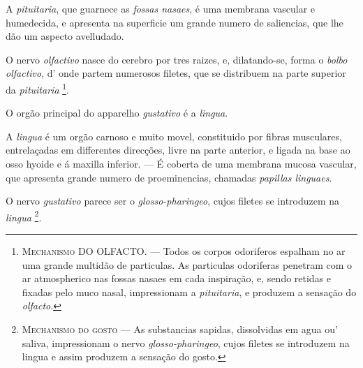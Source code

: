A \emph{pituitaria}, que guarnece as \emph{fossas nasaes}, é uma membrana vascular e humedecida, e apresenta na superficie um grande numero de saliencias, que lhe dão um aspecto avelludado.

O nervo \emph{olfactivo} nasce do cerebro por tres raizes, e, dilatando-se, forma o \emph{bolbo olfactivo}, d' onde partem numerosos filetes, que se distribuem na parte superior da \emph{pituitaria} \footnote{\textsc{Mechanismo} DO OLFACTO. --- Todos os corpos odoriferos espalham no ar uma grande multidão de particulas. As particulas odoriferas penetram com o ar atmospherico nas fossas nasaes em cada inspiração, e, sendo retidas e fixadas pelo muco nasal, impressionam a \emph{pituitaria}, e produzem a sensação do \emph{olfacto}.}.


O orgão principal do apparelho \emph{gustativo} é a \emph{lingua}.

A \emph{lingua} é um orgão carnoso e muito movel, constituido por fibras musculares, entrelaçadas em differentes direcções, livre na parte anterior, e ligada na base ao osso hyoide e á   maxilla inferior. --- É coberta de uma membrana mucosa vascular, que apresenta grande numero de proeminencias, chamadas \emph{papillas linguaes}.

O nervo \emph{gustativo} parece ser o \emph{glosso-pharingeo}, cujos filetes se introduzem na \emph{lingua} \footnote{\textsc{Mechanismo do gosto} --- As substancias sapidas, dissolvidas em agua ou' saliva, impressionam o nervo \emph{glosso-pharingeo}, cujos filetes se introduzem na lingua e assim produzem a sensação do gosto.}.


